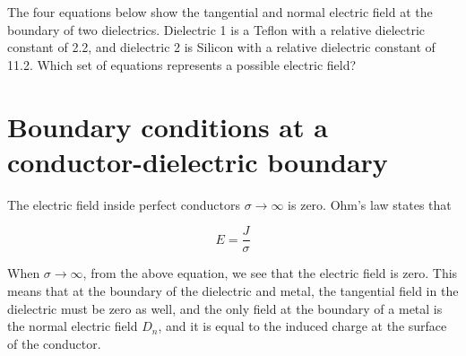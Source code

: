 \documentclass{ximera}
\begin{document}








   \begin{question}
 The four equations below show the tangential and normal electric field at the boundary of two dielectrics. Dielectric 1 is a Teflon with a relative dielectric constant of 2.2, and dielectric 2 is Silicon with a relative dielectric constant of 11.2. Which set of equations represents a possible electric field? 
   \begin{multipleChoice}
   \end{multipleChoice}
   \end{question}
   

\section{Boundary conditions at a conductor-dielectric boundary}

The electric field inside perfect conductors $\sigma \rightarrow \infty$ is zero. Ohm's law states that 

\begin{equation}
E=\frac{J}{\sigma}
\end{equation}


When $\sigma \rightarrow \infty$, from the above equation, we see that the electric field is zero. This means that at the boundary of the dielectric and metal, the tangential field in the dielectric must be zero as well, and the only field at the boundary of a metal is the normal electric field $D_n$, and it is equal to the induced charge at the surface of the conductor.
\end{document}
